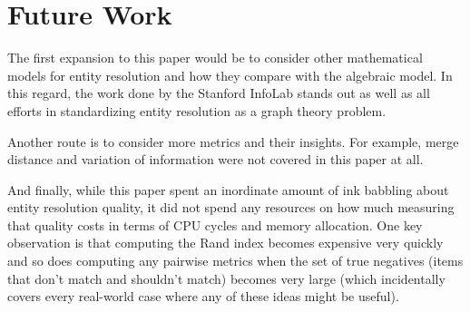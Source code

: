 \documentclass[11pt]{article}
\begin{document}
    \section[future]{Future Work}\label{section:future}

    The first expansion to this paper would be to consider other mathematical
    models for entity resolution and how they compare with the algebraic model.
    In this regard, the work done by the Stanford InfoLab stands out as well as
    all efforts in standardizing entity resolution as a graph theory problem.

    Another route is to consider more metrics and their insights.
    For example, merge distance and variation of information were not covered in
    this paper at all.

    And finally, while this paper spent an inordinate amount of ink babbling
    about entity resolution quality, it did not spend any resources on how much
    measuring that quality costs in terms of CPU cycles and memory allocation.
    One key observation is that computing the Rand index becomes expensive very
    quickly and so does computing any pairwise metrics when the set of true
    negatives (items that don't match and shouldn't match) becomes very large
    (which incidentally covers every real-world case where any of these ideas
    might be useful).

    
\end{document}
